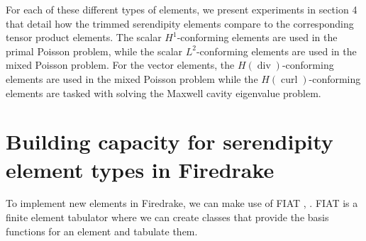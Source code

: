 \documentclass[format=acmsmall,screen,timestamp=false,a4paper]{acmart}
\DeclareMathOperator{\Div}{div}
\DeclareMathOperator{\curl}{curl}
\newcommand\akg[1]{\textbf{\textcolor[rgb]{.5,0,1}{[Andrew: #1]}}}
\newcommand{\calS}{\mathcal{S}}
\newcommand{\hcurl}{\ensuremath{{H}(\curl)}\xspace}
\newcommand{\hdiv}{\ensuremath{{H}(\Div)}\xspace}
\begin{document}
%	
%
%	
%  
%	
%
%
%  
%  
  
  For each of these different types of elements, we present experiments in section 4 that detail how the trimmed serendipity elements compare to the corresponding tensor product elements.  The scalar $H^1$-conforming elements are used in the primal Poisson problem, while the scalar $L^2$-conforming elements are used in the mixed Poisson problem.  For the vector elements, the \hdiv-conforming elements are used in the mixed Poisson problem while the \hcurl-conforming elements are tasked with solving the Maxwell cavity eigenvalue problem.
  
  
  \section{Building capacity for serendipity element types in Firedrake}
  \label{sec:buildcap}
  
  To implement new elements in Firedrake, we can make use of FIAT  \cite{kirby2004algorithm}, \cite{kirby2012fiat}.  FIAT is a finite element tabulator where we can create classes that provide the basis functions for an element and tabulate them.  
  
\end{document}
